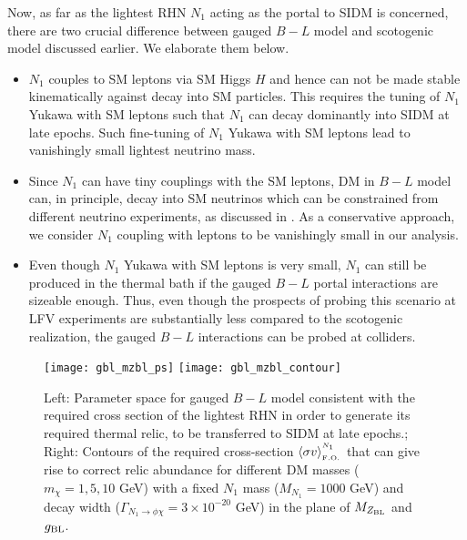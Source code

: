 \documentclass[prd,nofootinbib,preprint,superscriptaddress]{revtex4}
\begin{document}
Now, as far as the lightest RHN $N_1$ acting as the portal to SIDM is concerned, there are two crucial difference between gauged $B-L$ model and scotogenic model discussed earlier. We elaborate them below.
\begin{itemize}
\item $N_1$ couples to SM leptons via SM Higgs $H$ and hence can not be made stable kinematically against decay into SM particles. This requires the tuning of $N_1$ Yukawa with SM leptons such that $N_1$ can decay dominantly into SIDM at late epochs. Such fine-tuning of $N_1$ Yukawa with SM leptons lead to vanishingly small lightest neutrino mass.
\item Since $N_1$ can have tiny couplings with the SM leptons, DM in $B-L$ model can, in principle, decay into SM neutrinos which can be constrained from different neutrino experiments, as discussed in \cite{Bandyopadhyay:2020qpn}. As a conservative approach, we consider $N_1$ coupling with leptons to be vanishingly small in our analysis.
\item Even though $N_1$ Yukawa with SM leptons is very small, $N_1$ can still be produced in the thermal bath if the gauged $B-L$ portal interactions are sizeable enough. Thus, even though the prospects of probing this scenario at LFV experiments are substantially less compared to the scotogenic realization, the gauged $B-L$ interactions can be probed at colliders.
\end{itemize}

\begin{figure}[h!]
\centering
\texttt{[image: gbl\_mzbl\_ps]}
\hfil
\texttt{[image: gbl\_mzbl\_contour]}
\caption{Left: Parameter space for gauged $B-L$ model consistent with the required cross section of the lightest RHN in order to generate its required thermal relic, to be transferred to SIDM at late epochs.; Right: Contours of the required cross-section $\langle\sigma v \rangle^{^{N_1}}_{_{ \rm F.O.}}$ that can give rise to correct relic abundance for different DM masses ($m_{\chi} = 1,5,10$ GeV) with a fixed $N_1$ mass ($M_{N_1}=1000$ GeV) and decay width ($\Gamma_{N_{1} \to \phi \chi}=3\times10^{-20}$ GeV) in the plane of $M_{Z_{\rm BL}}$ and $g_{\rm BL}$. }
\label{blps}
\end{figure}
\end{document}
